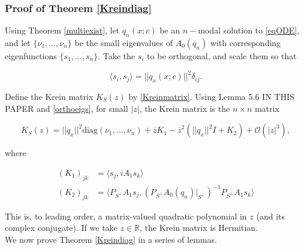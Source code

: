 \documentclass[12pt]{article}
\def\R{{\mathbb R}}
\begin{document}
\subsubsection{Proof of Theorem \ref{Kreindiag}}

Using Theorem \ref{multiexist}, let $q_n(x; c)$ be an $n-$modal solution to \eqref{eqODE}, and let $\{\nu_1, \dots, \nu_n\}$ be the small eigenvalues of $A_0(q_n)$ with corresponding eigenfunctions $\{ s_1, \dots, s_n \}$. Take the $s_i$ to be orthogonal, and scale them so that

\begin{equation}\label{orthoeigs}
\langle s_i, s_j \rangle = ||q_x(x; c)||^2 \delta_{ij}.
\end{equation}

Define the Krein matrix $K_S(z)$ by \eqref{Kreinmatrix}. Using Lemma 5.6 IN THIS PAPER and \eqref{orthoeigs}, for small $|z|$, the Krein matrix is the $n \times n$ matrix

\begin{equation}\label{Kreinform}
K_S(z) = ||q_x||^2 \text{diag}(\nu_1, \dots, \nu_n) + \overline{z} K_1 
- \overline{z}^2 ( ||q_x||^2 I + K_2) + \mathcal{O}(|z|^3),
\end{equation}

where

\begin{align}
(K_1)_{jk} &= \langle s_j, i A_1 s_k \rangle \label{defK1} \\
(K_2)_{jk} &= \langle P_{S^\perp} A_1 s_j, (P_{S^\perp} A_0(q_n)|_{S^\perp})^{-1} P_{S^\perp} A_1 s_k \rangle \label{defK2}
\end{align}

This is, to leading order, a matrix-valued quadratic polynomial in $z$ (and its complex conjugate). If we take $z \in \R$, the Krein matrix is Hermitian.\\

We now prove Theorem \ref{Kreindiag} in a series of lemmas. 

\end{document}

